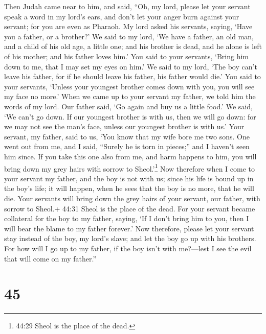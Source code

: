  Then Judah came near to him, and said, ``Oh, my lord,
please let your servant speak a word in my lord's ears, and don't let
your anger burn against your servant; for you are even as Pharaoh.
 My lord asked his servants, saying, `Have you a father, or
a brother?'  We said to my lord, `We have a father, an old
man, and a child of his old age, a little one; and his brother is dead,
and he alone is left of his mother; and his father loves him.'
 You said to your servants, `Bring him down to me, that I
may set my eyes on him.'  We said to my lord, `The boy
can't leave his father, for if he should leave his father, his father
would die.'  You said to your servants, `Unless your
youngest brother comes down with you, you will see my face no more.'
 When we came up to your servant my father, we told him the
words of my lord.  Our father said, `Go again and buy us a
little food.'  We said, `We can't go down. If our youngest
brother is with us, then we will go down: for we may not see the man's
face, unless our youngest brother is with us.'  Your
servant, my father, said to us, `You know that my wife bore me two sons.
 One went out from me, and I said, ``Surely he is torn in
pieces;'' and I haven't seen him since.  If you take this
one also from me, and harm happens to him, you will bring down my grey
hairs with sorrow to Sheol.'\footnote{44:29 Sheol is the place of the
  dead.}  Now therefore when I come to your servant my
father, and the boy is not with us; since his life is bound up in the
boy's life;  it will happen, when he sees that the boy is
no more, that he will die. Your servants will bring down the grey hairs
of your servant, our father, with sorrow to Sheol.+ 44:31 Sheol is the
place of the dead.  For your servant became collateral for
the boy to my father, saying, `If I don't bring him to you, then I will
bear the blame to my father forever.'  Now therefore,
please let your servant stay instead of the boy, my lord's slave; and
let the boy go up with his brothers.  For how will I go up
to my father, if the boy isn't with me?---lest I see the evil that will
come on my father.''

\hypertarget{section-44}{%
\section{45}\label{section-44}}

